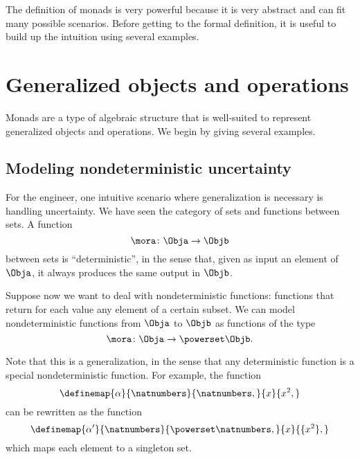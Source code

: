 

The definition of monads is very powerful because it is very abstract and can fit many possible scenarios. Before getting to the formal definition, it is useful to build up the intuition using several examples. 

\section{Generalized objects and operations}


Monads are a type of algebraic structure that is well-suited to represent generalized objects and operations. We begin by giving several examples. 


\subsection{Modeling nondeterministic uncertainty}

For the engineer, one intuitive scenario where generalization is necessary is handling uncertainty. 
We have seen the category  \Set of sets and functions between sets. A function 
\begin{equation}\label{eq:monad-simple}
    \mora\colon\Obja\to\Objb
\end{equation}
between sets is ``deterministic'', in the sense that, given as input an element of $\Obja$, it always produces the same output in $\Objb$. 

Suppose now we want to deal with nondeterministic functions: functions that return for each value any element of a certain subset.  We can model nondeterministic functions from $\Obja$ to $\Objb$ as functions of the type 
\begin{equation}\label{eq:monad-generalized}
    \mora\colon\Obja\to\powerset\Objb.
\end{equation}

Note that this is a generalization, in the sense that any deterministic function is a special nondeterministic function. 
For example, the function
% 
\begin{equation}\label{eq:monad-alpha-example1}
    \definemap{\alpha}{\natnumbers}{\natnumbers,}%
    {x}{x^2,}
\end{equation}
% 
can be rewritten as the function
% 
\begin{equation}\label{eq:monad-alpha-example2}
    \definemap{\alpha'}{\natnumbers}{\powerset\natnumbers,}%
    {x}{\{x^2\},}
\end{equation}
% 
which maps each element to a singleton set.

